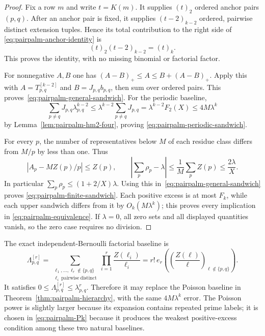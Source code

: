 \begin{proof}
Fix a row $m$ and write $t=K(m)$.  It supplies $(t)_2$ ordered
anchor pairs $(p,q)$.  After an anchor pair is fixed, it supplies
$(t-2)_{k-2}$ ordered, pairwise distinct extension tuples.  Hence its
total contribution to the right side of
\eqref{eq:pairpalm-anchor-identity} is
\[
 (t)_2(t-2)_{k-2}=(t)_k.
\]
This proves the identity, with no missing binomial or factorial factor.

For nonnegative $A,B$ one has
$(A-B)_+\leq A\leq B+(A-B)_+$.  Apply this with
$A=T_{p,q}^{[k-2]}$ and $B=J_{p,q}b_{p,q}$, then sum over ordered
pairs.  This proves~\eqref{eq:pairpalm-general-sandwich}.
For the periodic baseline,
\[
 \sum_{p\ne q}J_{p,q}\lambda_{p,q}^{k-2}
 \leq\lambda^{k-2}\sum_{p\ne q}J_{p,q}
 =\lambda^{k-2}F_2(X)
 \leq4M\lambda^k
\]
by Lemma~\ref{lem:pairpalm-hm2-four}, proving
\eqref{eq:pairpalm-periodic-sandwich}.

For every $p$, the number of representatives below $M$ of each residue
class differs from $M/p$ by less than one.  Thus
\[
 |A_p-MZ(p)/p|\leq Z(p),
 \qquad
 \left|\sum_p\rho_p-\lambda\right|
 \leq\frac1M\sum_pZ(p)\leq\frac{2\lambda}{X}.
\]
In particular $\sum_p\rho_p\leq(1+2/X)\lambda$.
Using this in~\eqref{eq:pairpalm-general-sandwich} proves
\eqref{eq:pairpalm-finite-sandwich}.
Each positive excess is at most $F_k$, while each upper sandwich differs
from it by $O_k(M\lambda^k)$; this proves every implication in
\eqref{eq:pairpalm-equivalence}.  If $\lambda=0$, all zero sets and all
displayed quantities vanish, so the zero case requires no division.
\end{proof}

\begin{remark}
The exact independent-Bernoulli factorial baseline is
\begin{equation}\label{eq:pairpalm-bernoulli-baseline}
 \Lambda_{p,q}^{[r]}
 =\sum_{\substack{\ell_1,\ldots,\ell_r\notin\{p,q\}\\
                   \ell_i\ \mathrm{pairwise\ distinct}}}
   \prod_{i=1}^r\frac{Z(\ell_i)}{\ell_i}
 =r!\,e_r\left(
   \left(\frac{Z(\ell)}\ell\right)_{\ell\notin\{p,q\}}
   \right).
\end{equation}
It satisfies
$0\leq\Lambda_{p,q}^{[r]}\leq\lambda_{p,q}^r$.
Therefore it may replace the Poisson baseline in
Theorem~\ref{thm:pairpalm-hierarchy}, with the same $4M\lambda^k$
error.  The Poisson power is slightly larger because its expansion
contains repeated prime labels; it is chosen in
\eqref{eq:pairpalm-Pk} because it produces the weakest positive-excess
condition among these two natural baselines.
\end{remark}

